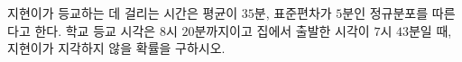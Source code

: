 지현이가 등교하는 데 걸리는 시간은 평균이 $35$분, 표준편차가 $5$분인 정규분포를 따른다고 한다. 학교 등교 시각은 $8$시 $20$분까지이고 집에서 출발한 시각이 $7$시 $43$분일 때, 지현이가 지각하지 않을 확률을 구하시오. 
